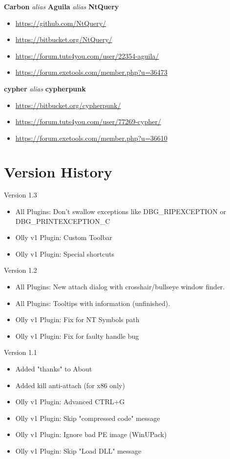 \documentclass[10pt,a4paper]{article}
\begin{document}
\begin{center}
\textbf{Carbon} \textit{alias} \textbf{Aguila} \textit{alias} \textbf{NtQuery}
\begin{itemize}
\item \url{https://github.com/NtQuery/}
\item \url{https://bitbucket.org/NtQuery/}
\item \url{https://forum.tuts4you.com/user/22354-aguila/}
\item \url{https://forum.exetools.com/member.php?u=36473}
\end{itemize}


\textbf{cypher} \textit{alias} \textbf{cypherpunk}
\begin{itemize}
\item \url{https://bitbucket.org/cypherpunk/}
\item \url{https://forum.tuts4you.com/user/77269-cypher/}
\item \url{https://forum.exetools.com/member.php?u=36610}
\end{itemize}
\end{center}

\section{Version History}

Version 1.3
\begin{itemize}
\item All Plugins: Don't swallow exceptions like DBG\_RIPEXCEPTION or DBG\_PRINTEXCEPTION\_C
\item Olly v1 Plugin: Custom Toolbar
\item Olly v1 Plugin: Special shortcuts
\end{itemize}

Version 1.2
\begin{itemize}
\item All Plugins: New attach dialog with crosshair/bullseye window finder.
\item All Plugins: Tooltips with information (unfinished).
\item Olly v1 Plugin: Fix for NT Symbols path
\item Olly v1 Plugin: Fix for faulty handle bug
\end{itemize}

Version 1.1
\begin{itemize}
\item Added "thanks" to About
\item Added kill anti-attach (for x86 only)
\item Olly v1 Plugin: Advanced CTRL+G
\item Olly v1 Plugin: Skip "compressed code" message
\item Olly v1 Plugin: Ignore bad PE image (WinUPack)
\item Olly v1 Plugin: Skip "Load DLL" message
\end{itemize}


\end{document}
